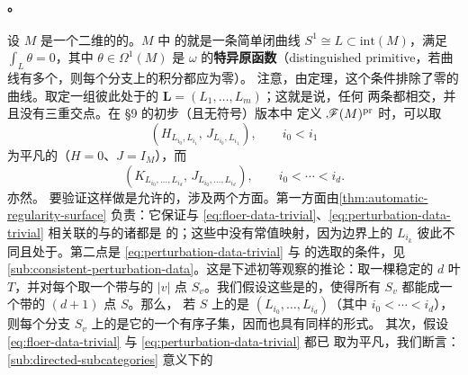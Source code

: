 \paragraph{\trCombinatorialFloerCohomology。}\label{sub:combinatorial-floer-cohomology}
设 $M$ 是一个二维的\trCorneredBoundary{}的\trExactSymplectic\trManifold。$M$ 中%
\trConnected{}的\trExact\trLagrange\trSubmanifold{}就是一条简单闭曲线 $S^1\cong L\subset%
\mathrm{int}(M)$，满足 $\int_L\theta=0$，其中 $\theta\in\Omega^1(M)$ 是\trSymplecticForm{}
$\omega$ 的\textbf{特异原函数}（distinguished primitive，若曲线有多个\trConnectedComponent，则每个分支上的积分都应为零）。%
注意，由\trStokes{}定理，这个条件排除了零\trHomology{}的曲线。取定一组彼此处于\trGeneralPosition{}的%
\trExact\trLagrange\trSubmanifold{} $\boldsymbol{L}=(L_1,\ldots,L_m)$；这就是说，任何%
两条都\trTransverse{}相交，并且没有三重交点。在 §9 的初步（\trUngraded{}且无符号）版本中%
定义\trFukayaCategory{} $\mathscr{F}(M)^{\mathrm{pr}}$ 时，可以取\trFloerDatum
\begin{equation}\label{eq:floer-data-trivial}
(H_{L_{i_0},L_{i_1}},\,J_{L_{i_0},L_{i_1}}),\qquad i_0<i_1
\end{equation}
为平凡的（$H=0$、$J=I_M$），而\trPerturbationDatum
\begin{equation}\label{eq:perturbation-data-trivial}
(K_{L_{i_0},\ldots,L_{i_d}},\,J_{L_{i_0},\ldots,L_{i_d}}),\qquad i_0<\cdots<i_d.
\end{equation}
亦然。
要验证这样做是允许的，涉及两个方面。第一方面由\cref{thm:automatic-regularity-surface}%
负责：它保证与 \eqref{eq:floer-data-trivial}、\eqref{eq:perturbation-data-trivial}%
相关联的\trFloer\trTrajectory{}与\trHolomorphicPolygon{}的诸\trModuliSpace{}都是%
\trRegular{}的；这些\trModuliSpace{}中没有常值映射，因为边界上的\trLagrange\trLabel{}
$L_{i_k}$ 彼此不同且处于\trGeneralPosition{}。第二点是 \eqref{eq:perturbation-data-trivial} 与%
\trPerturbationDatum{}的\trUniversal{}选取的\trConsistency{}条件\trCompatible，见%
\cref{sub:consistent-perturbation-data}。这是下述初等观察的推论：取一棵稳定的 $d$ 叶%
\trTree{} $T$，并对每个\trVertex{}取一个带\trLagrange\trLabel{}与\trStriplikeEnd{}的%
$|v|$ 点\trPointedDisc{} $S_v$。我们假设这些\trLabel{}是\trCompatible{}的，使得所有 $S_v$%
都能\trGluing{}成一个带\trLagrange\trLabel{}的 $(d{+}1)$ 点\trPointedDisc{} $S$。那么，%
若 $S$ 上的\trLabel{}是 $(L_{i_0},\ldots,L_{i_d})$（其中 $i_0<\cdots<i_d$），则每个分支 $S_v$%
上的\trLabel{}是它的一个有序子集，因而也具有同样的形式。
其次，假设 \eqref{eq:floer-data-trivial} 与 \eqref{eq:perturbation-data-trivial} 都已%
取为平凡，我们断言：\cref{sub:directed-subcategories} 意义下的\trDirected{}%
